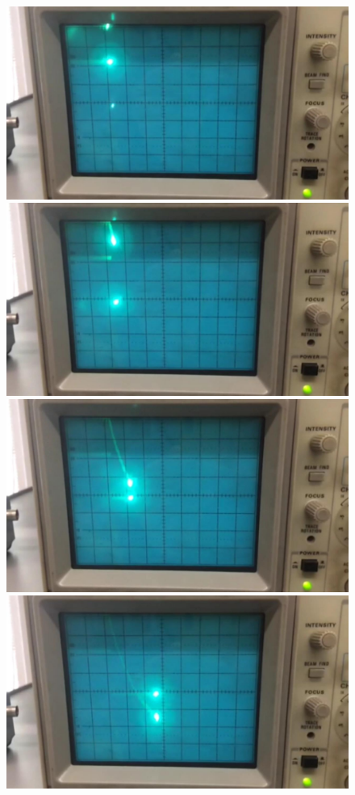 \documentclass{article}
\begin{document}
\begin{figure}[H] %
    \centering
    \includegraphics[scale = 0.08]{003.jpg}
    \includegraphics[scale = 0.08]{006.jpg}
    \includegraphics[scale = 0.08]{016.jpg}
    \includegraphics[scale = 0.08]{033.jpg}

\end{figure}
\end{document}
